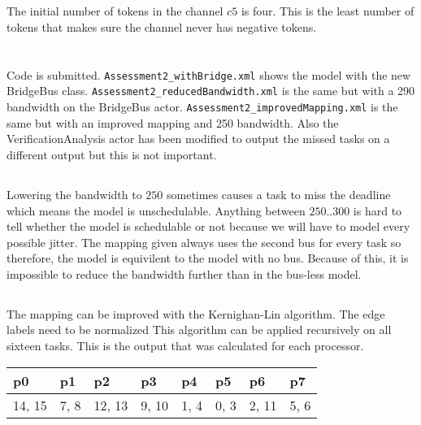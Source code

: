 \documentclass{article}
\newcommand{\code}[1]{\texttt{#1}}
\begin{document}
\subsection{}
The initial number of tokens in the channel $c5$ is four. This is the least number of tokens that makes sure the channel never has negative tokens.

\section{}

\subsection{}
Code is submitted.
\code{Assessment2\_withBridge.xml} shows the model with the new BridgeBus class.
\code{Assessment2\_reducedBandwidth.xml} is the same but with a 290 bandwidth on the BridgeBus actor.
\code{Assessment2\_improvedMapping.xml} is the same but with an improved mapping and 250 bandwidth.
Also the VerificationAnalysis actor has been modified to output the missed tasks on a different output but this is not important.

\subsection{}
Lowering the bandwidth to $250$ sometimes causes a task to miss the deadline which means the model is unschedulable. Anything between $250..300$ is hard to tell whether the model is schedulable or not because we will have to model every possible jitter. The mapping given always uses the second bus for every task so therefore, the model is equivilent to the model with no bus. Because of this, it is impossible to reduce the bandwidth further than in the bus-less model.

\subsection{}
The mapping can be improved with the Kernighan-Lin algorithm. The edge labels need to be normalized This algorithm can be applied recursively on all sixteen tasks. This is the output that was calculated for each processor.

\begin{table}[H]
  \centering \small
  \begin{tabular}{|l|l|l|l||l|l|l|l|}
    \hline
p0     & p1   & p2     & p3    & p4   & p5   & p6    & p7 \\ \hline
14, 15 & 7, 8 & 12, 13 & 9, 10 & 1, 4 & 0, 3 & 2, 11 & 5, 6 \\ \hline
\end{tabular}
\end{table}
\end{document}
